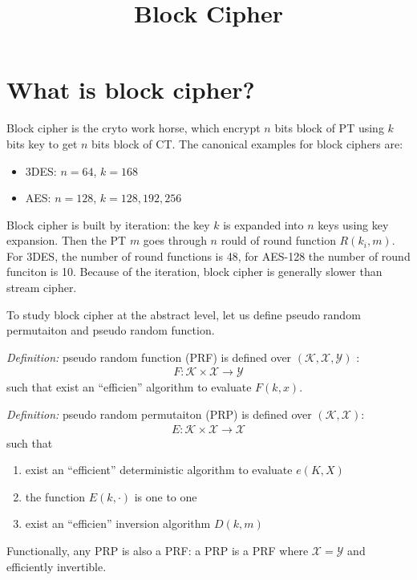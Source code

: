 \documentclass{article}
\title{Block Cipher}
\begin{document}
\maketitle

\section{What is block cipher?}
Block cipher is the cryto work horse, which encrypt $n$ bits block of PT using
$k$ bits key to get $n$ bits block of CT. The canonical examples for block
ciphers are:
\begin{itemize}
\item 3DES: $n = 64$, $k = 168$
\item AES: $n = 128$, $k = 128, 192, 256$
\end{itemize}

Block cipher is built by iteration: the key $k$ is expanded into $n$ keys using
key expansion. Then the PT $m$ goes through $n$ rould of round function $R(k_i,
m)$. For 3DES, the number of round functions is 48, for AES-128 the number of
round funciton is 10. Because of the iteration, block cipher is generally slower
than stream cipher.

To study block cipher at the abstract level, let us define pseudo random
permutaiton and pseudo random function. 

\emph{Definition: } pseudo random function (PRF) is defined over $(\mathcal{K,
  X, Y})$ :
\begin{eqnarray}
  F: \mathcal{K} \times \mathcal{X} \to \mathcal {Y}
\end{eqnarray}
such that exist an ``efficien'' algorithm to evaluate $F(k, x)$.

\emph{Definition: } pseudo random permutaiton (PRP) is defined over
$(\mathcal{K, X})$:
\begin{eqnarray}
  E: \mathcal{K} \times \mathcal{X} \to \mathcal{X}
\end{eqnarray}
such that
\begin{enumerate}
\item exist an ``efficient'' deterministic algorithm to evaluate $e(K,X)$
\item the function $E(k, \cdot) $ is one to one
\item exist an ``efficien'' inversion algorithm $D(k, m)$
\end{enumerate}

Functionally, any PRP is also a PRF: a PRP is a PRF where $\mathcal{X} =
\mathcal{Y}$ and efficiently invertible.
\end{document}
